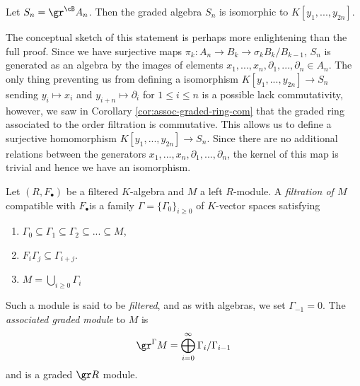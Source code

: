 \begin{example}\label{example:graded-algebra-of-Weyl-algebra}
	Let $S_n = \gr^\cB A_n$. Then the graded algebra $S_n$ is isomorphic to $K[y_1,...,y_{2n}]$. 

	The conceptual sketch of this statement is perhaps more enlightening than the full proof. Since we have surjective maps $\pi_k:A_n\to B_k \to{\sigma_k} B_k/B_{k-1}$, $S_n$ is generated as an algebra by the images of elements $x_1,...,x_n,\partial_1,...,\partial_n \in A_n$. The only thing preventing us from defining a isomorphism $K[y_1,...,y_{2n}]\to S_n$ sending $y_i\mapsto x_i$ and $y_{i+n}\mapsto \partial_{i}$ for $1\leq i\leq n$ is a possible lack commutativity, however, we saw in Corollary \ref{cor:assoc-graded-ring-com} that the graded ring associated to the order filtration is commutative. This allows us to define a surjective homomorphism $K[y_1,...,y_{2n}] \to S_n$. Since there are no additional relations between the generators $x_1,...,x_n,\partial_1,...,\partial_n$, the kernel of this map is trivial and hence we have an isomorphism. 
\end{example}

\begin{defn}\label{defn:filtered-module}
	Let $(R,F_\bullet)$ be a filtered $K$-algebra and $M$ a left $R$-module. A \emph{filtration of $M$} compatible with $F_\bullet$is a family $\Gamma = \{\Gamma_0\}_{i\geq 0}$ of $K$-vector spaces satisfying
	\begin{enumerate}[(1)]
		\item $\Gamma_0 \subseteq \Gamma_1 \subseteq \Gamma_2 \subseteq ... \subseteq M$,
		\item $F_i\Gamma_j \subseteq \Gamma_{i+j}$.
		\item $M = \bigcup_{i\geq 0} \Gamma_i$
	\end{enumerate}
	Such a module is said to be \emph{filtered}, and as with algebras, we set $\Gamma_{-1} = 0$. The \emph{associated graded module} to $M$ is
	\begin{align*}
		\gr^{\Gamma} M = \bigoplus_{i=0}^\infty \Gamma_i/\Gamma_{i-1}
	\end{align*}
	and is a graded $\gr R$ module.
\end{defn}

